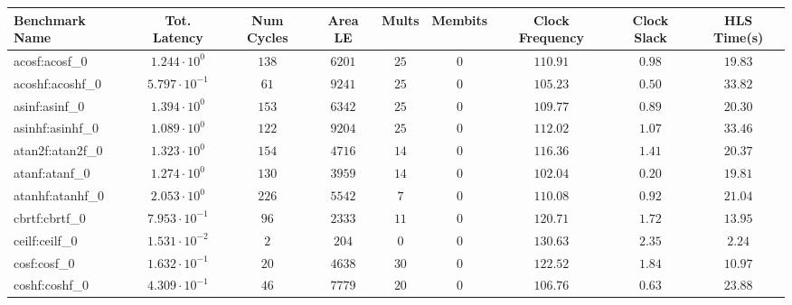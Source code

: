 \begin{tabular}{|l|c|c|c|c|c|c|c|c|}
\hline
Benchmark Name               & Tot. Latency            & Num Cycles & Area LE    & Mults   & Membits  & Clock Frequency & Clock Slack & HLS Time(s) \\
\hline
acosf:acosf\_0               & $ 1.244 \cdot 10^{0}  $ & $ 138    $ & $ 6201   $ & $ 25  $ & $ 0    $ & $ 110.91      $ & $ 0.98    $ & $ 19.83   $ \\
acoshf:acoshf\_0             & $ 5.797 \cdot 10^{-1} $ & $ 61     $ & $ 9241   $ & $ 25  $ & $ 0    $ & $ 105.23      $ & $ 0.50    $ & $ 33.82   $ \\
asinf:asinf\_0               & $ 1.394 \cdot 10^{0}  $ & $ 153    $ & $ 6342   $ & $ 25  $ & $ 0    $ & $ 109.77      $ & $ 0.89    $ & $ 20.30   $ \\
asinhf:asinhf\_0             & $ 1.089 \cdot 10^{0}  $ & $ 122    $ & $ 9204   $ & $ 25  $ & $ 0    $ & $ 112.02      $ & $ 1.07    $ & $ 33.46   $ \\
atan2f:atan2f\_0             & $ 1.323 \cdot 10^{0}  $ & $ 154    $ & $ 4716   $ & $ 14  $ & $ 0    $ & $ 116.36      $ & $ 1.41    $ & $ 20.37   $ \\
atanf:atanf\_0               & $ 1.274 \cdot 10^{0}  $ & $ 130    $ & $ 3959   $ & $ 14  $ & $ 0    $ & $ 102.04      $ & $ 0.20    $ & $ 19.81   $ \\
atanhf:atanhf\_0             & $ 2.053 \cdot 10^{0}  $ & $ 226    $ & $ 5542   $ & $ 7   $ & $ 0    $ & $ 110.08      $ & $ 0.92    $ & $ 21.04   $ \\
cbrtf:cbrtf\_0               & $ 7.953 \cdot 10^{-1} $ & $ 96     $ & $ 2333   $ & $ 11  $ & $ 0    $ & $ 120.71      $ & $ 1.72    $ & $ 13.95   $ \\
ceilf:ceilf\_0               & $ 1.531 \cdot 10^{-2} $ & $ 2      $ & $ 204    $ & $ 0   $ & $ 0    $ & $ 130.63      $ & $ 2.35    $ & $ 2.24    $ \\
cosf:cosf\_0                 & $ 1.632 \cdot 10^{-1} $ & $ 20     $ & $ 4638   $ & $ 30  $ & $ 0    $ & $ 122.52      $ & $ 1.84    $ & $ 10.97   $ \\
coshf:coshf\_0               & $ 4.309 \cdot 10^{-1} $ & $ 46     $ & $ 7779   $ & $ 20  $ & $ 0    $ & $ 106.76      $ & $ 0.63    $ & $ 23.88   $ \\

\end{tabular}
